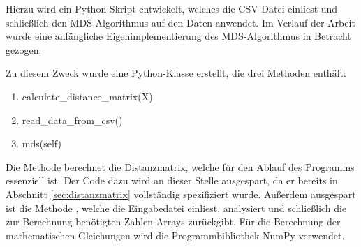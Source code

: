 Hierzu wird ein Python-Skript entwickelt, welches die CSV-Datei einliest und
schließlich den MDS-Algorithmus auf den Daten anwendet. Im Verlauf der
Arbeit wurde eine anfängliche Eigenimplementierung des MDS-Algorithmus in
Betracht gezogen.

Zu diesem Zweck wurde eine Python-Klasse erstellt, die drei Methoden enthält:
\begin{enumerate}
    \item calculate\_distance\_matrix(X)
    \item read\_data\_from\_csv()
    \item mds(self)
\end{enumerate}

Die Methode  berechnet die Distanzmatrix,
welche für den Ablauf des Programms essenziell ist. Der Code dazu wird an
dieser Stelle ausgespart, da er bereits in Abschnitt \ref{sec:distanzmatrix}
vollständig spezifiziert wurde. Außerdem ausgespart ist die Methode
, welche die Eingabedatei einliest, analysiert und
schließlich die zur Berechnung benötigten Zahlen-Arrays zurückgibt. Für die Berechnung der mathematischen Gleichungen wird die Programmbibliothek NumPy verwendet. \parencite{team_numpy_2023}

